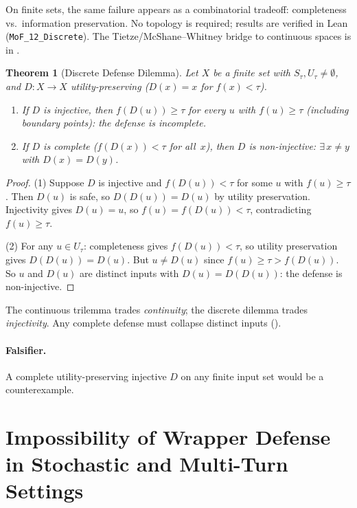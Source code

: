 \documentclass[11pt]{article}
\newtheorem{theorem}{Theorem}[section]
\begin{document}
On finite sets, the same failure appears as a combinatorial tradeoff: completeness vs.\ information preservation. No topology is required; results are verified in Lean (\texttt{MoF\_12\_Discrete}). The Tietze/McShane--Whitney bridge to continuous spaces is in .

\begin{theorem}[Discrete Defense Dilemma]
\label{thm:disc-dilemma}
Let $X$ be a finite set with $S_\tau, U_\tau \neq \emptyset$, and
$D\colon X \to X$ utility-preserving ($D(x) = x$ for $f(x) < \tau$).
\begin{enumerate}[nosep]
  \item If $D$ is injective, then $f(D(u)) \geq \tau$ for every
    $u$ with $f(u) \geq \tau$ (including boundary points): the
    defense is incomplete.
  \item If $D$ is complete ($f(D(x)) < \tau$ for all~$x$), then $D$ is
    non-injective: $\exists\, x \neq y$ with $D(x) = D(y)$.
\end{enumerate}
\end{theorem}

\begin{proof}
(1) Suppose $D$ is injective and $f(D(u)) < \tau$ for some $u$ with
$f(u) \geq \tau$. Then $D(u)$ is safe, so $D(D(u)) = D(u)$ by utility
preservation. Injectivity gives $D(u) = u$, so
$f(u) = f(D(u)) < \tau$, contradicting $f(u) \geq \tau$.

(2) For any $u \in U_\tau$: completeness gives $f(D(u)) < \tau$, so
utility preservation gives $D(D(u)) = D(u)$. But
$u \neq D(u)$ since $f(u) \geq \tau > f(D(u))$.
So $u$ and $D(u)$ are distinct inputs with $D(u) = D(D(u))$: the
defense is non-injective.
\end{proof}

The continuous trilemma trades \emph{continuity}; the discrete dilemma trades \emph{injectivity}. Any complete defense must collapse distinct inputs ().

\paragraph{Falsifier.}
A complete utility-preserving injective $D$ on any finite input set would be a counterexample.


\section{Impossibility of Wrapper Defense in Stochastic and Multi-Turn Settings}
\label{sec:extensions}
\end{document}
